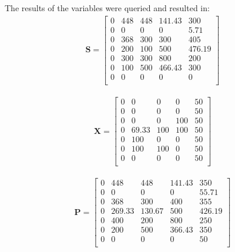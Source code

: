 \documentclass[11pt]{article}
\begin{document}
The results of the variables were queried and resulted in:
\begin{align*}
  \textbf{S} = 
  \begin{bmatrix}
  0 & 448 & 448 & 141.43 & 300 \\
  0 & 0 & 0 & 0 & 5.71 \\
  0 & 368 & 300 & 300 & 405 \\
  0 & 200 & 100 & 500 & 476.19 \\
  0 & 300 & 300 & 800 & 200 \\
  0 & 100 & 500 & 466.43 & 300 \\
  0 & 0 & 0 & 0 & 0 \\
  \end{bmatrix}
\end{align*}

\begin{align*}
  \textbf{X} = 
  \begin{bmatrix}
  0 & 0 & 0 & 0 & 50 \\
  0 & 0 & 0 & 0 & 50 \\
  0 & 0 & 0 & 100 & 50 \\
  0 & 69.33 & 100 & 100 & 50 \\
  0 & 100 & 0 & 0 & 50 \\
  0 & 100 & 100 & 0 & 50 \\
  0 & 0 & 0 & 0 & 50 \\
  \end{bmatrix}
\end{align*}

\begin{align*}
  \textbf{P} = 
  \begin{bmatrix}
  0 & 448 & 448 & 141.43 & 350 \\
  0 & 0 & 0 & 0 & 55.71 \\
  0 & 368 & 300 & 400 & 355 \\
  0 & 269.33 & 130.67 & 500 & 426.19 \\
  0 & 400 & 200 & 800 & 250 \\
  0 & 200 & 500 & 366.43 & 350 \\
  0 & 0 & 0 & 0 & 50 \\
  \end{bmatrix}
\end{align*}
\end{document}

